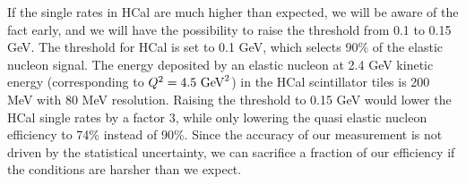 \documentclass[11pt]{article}
\begin{document}
If the single rates in HCal are much higher than expected, we will be aware of the fact early, and we will have the possibility to raise the threshold from 0.1 to 0.15 GeV.
The threshold for HCal is set to 0.1 GeV, which selects 90\% of the elastic nucleon signal.
The energy deposited by an elastic nucleon at 2.4 GeV kinetic energy (corresponding to $Q^2 = 4.5~{\rm GeV}^2$) in the HCal scintillator tiles is 200 MeV with 80 MeV resolution.
Raising the threshold to 0.15 GeV would lower the HCal single rates by a factor 3, while only lowering the quasi elastic nucleon efficiency to 74\% instead of 90\%.
Since the accuracy of our measurement is not driven by the statistical uncertainty, we can sacrifice a fraction of our efficiency if the conditions are harsher than we expect.
\end{document}
